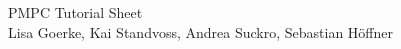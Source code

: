 \documentclass{article}
\begin{document}
\begin{center}
\LARGE PMPC Tutorial Sheet \TutorialSheetNumber\\
\small Lisa Goerke, Kai Standvoss, Andrea Suckro, Sebastian Höffner
\end{center}
\vspace{0.5cm}
\normalsize
\end{document}
